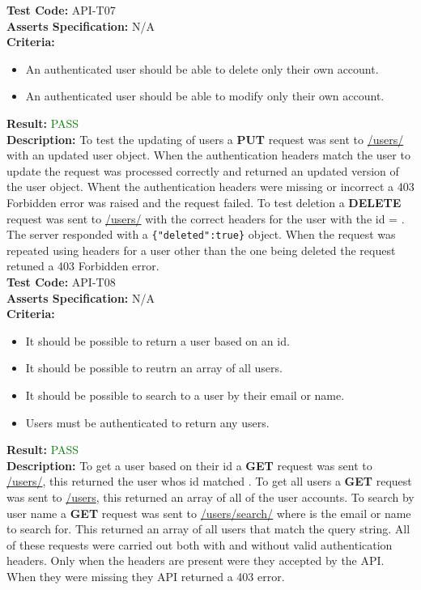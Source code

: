 \documentclass[11pt,a4paper]{report}
\begin{document}
\label{test:API-T07}
\noindent\textbf{Test Code:} API-T07\\
\textbf{Asserts Specification:} N/A \\ 
\textbf{Criteria:} \begin{itemize}
                     \item An authenticated user should be able to delete only their own account.
                     \item An authenticated user should be able to modify only their own account. 
                   \end{itemize}  
\textbf{Result:} \textcolor{green}{PASS}\\ 
\textbf{Description:} To test the updating of users a \textbf{PUT} request was sent to \url{/users/} with an updated user object. When the authentication headers match the user to update the request was processed correctly and returned an updated version of the user object. Whent the authentication headers were missing or incorrect a 403 Forbidden error was raised and the request failed. To test deletion a \textbf{DELETE} request was sent to \url{/users/} with the correct headers for the user with the id = . The server responded with a \lstinline${"deleted":true}$ object. When the request was repeated using headers for a user other than the one being deleted the request retuned a 403 Forbidden error. \\

\label{test:API-T08}
\noindent\textbf{Test Code:} API-T08\\
\textbf{Asserts Specification:} N/A \\ 
\textbf{Criteria:} \begin{itemize}
                     \item It should be possible to return a user based on an id.
                     \item It should be possible to reutrn an array of all users.
                     \item It should be possible to search to a user by their email or name.
                     \item Users must be authenticated to return any users. 
                   \end{itemize}  
\textbf{Result:} \textcolor{green}{PASS}\\ 
\textbf{Description:} To get a user based on their id a \textbf{GET} request was sent to \url{/users/}, this returned the user whos id matched . To get all users a \textbf{GET} request was sent to \url{/users}, this returned an array of all of the user accounts. To search by user name a \textbf{GET} request was sent to \url{/users/search/} where  is the email or name to search for. This returned an array of all users that match the query string. All of these requests were carried out both with and without valid authentication headers. Only when the headers are present were they accepted by the API. When they were missing they API returned a 403 error. \\
\end{document}
